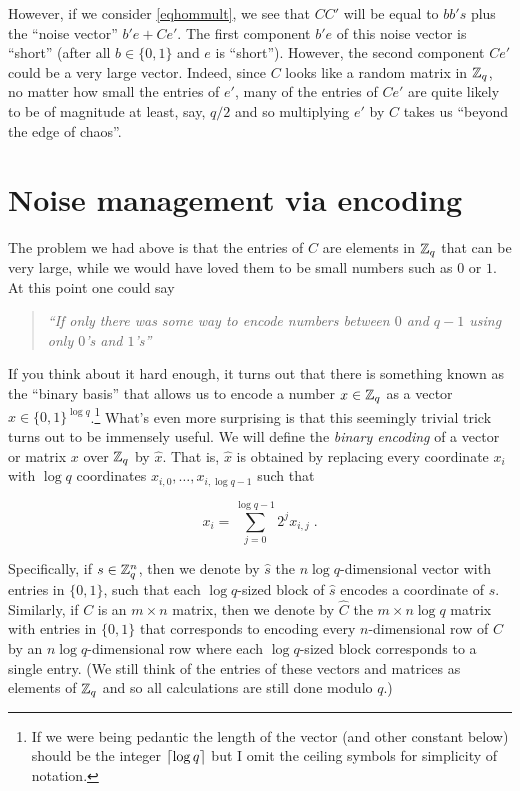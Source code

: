However, if we consider \eqref{eqhommult}, we see that
\(\ensuremath{\mathit{CC}}'\) will be equal to \(bb's\) plus the ``noise
vector'' \(b'e + Ce'\). The first component \(b'e\) of this noise vector
is ``short'' (after all \(b\in \{0,1\}\) and \(e\) is ``short'').
However, the second component \(Ce'\) could be a very large vector.
Indeed, since \(C\) looks like a random matrix in \({\mathbb{Z}}_q\), no matter
how small the entries of \(e'\), many of the entries of \(Ce'\) are
quite likely to be of magnitude at least, say, \(q/2\) and so
multiplying \(e'\) by \(C\) takes us ``beyond the edge of chaos''.

\section{Noise management via
encoding}\label{Noise-management-via-encoding}

The problem we had above is that the entries of \(C\) are elements in
\({\mathbb{Z}}_q\) that can be very large, while we would have loved them to be
small numbers such as \(0\) or \(1\). At this point one could say

\begin{quote}
\emph{``If only there was some way to encode numbers between \(0\) and
\(q-1\) using only \(0\)'s and \(1\)'s''}
\end{quote}

If you think about it hard enough, it turns out that there is something
known as the ``binary basis'' that allows us to encode a number
\(x\in{\mathbb{Z}}_q\) as a vector \(\hat{x}\in\{0,1\}^{\log q}\).\footnote{If we
  were being pedantic the length of the vector (and other constant
  below) should be the integer \(\lceil \log q \rceil\) but I omit the ceiling
  symbols for simplicity of notation.} What's even more surprising is
that this seemingly trivial trick turns out to be immensely useful. We
will define the \emph{binary encoding} of a vector or matrix \(x\) over
\({\mathbb{Z}}_q\) by \(\hat{x}\). That is, \(\hat{x}\) is obtained by replacing
every coordinate \(x_i\) with \(\log q\) coordinates
\(x_{i,0},\ldots,x_{i,\log q-1}\) such that

\[x_i = \sum_{j=0}^{\log q-1}2^j x_{i,j} \;. \label{eqbinaryencoding}\]

Specifically, if \(s\in {\mathbb{Z}}_q^n\), then we denote by \(\hat{s}\) the
\(n\log q\)-dimensional vector with entries in \(\{0,1\}\), such that
each \(\log q\)-sized block of \(\hat{s}\) encodes a coordinate of
\(s\). Similarly, if \(C\) is an \(m\times n\) matrix, then we denote by
\(\hat{C}\) the \(m\times n\log q\) matrix with entries in \(\{0,1\}\)
that corresponds to encoding every \(n\)-dimensional row of \(C\) by an
\(n\log q\)-dimensional row where each \(\log q\)-sized block
corresponds to a single entry. (We still think of the entries of these
vectors and matrices as elements of \({\mathbb{Z}}_q\) and so all calculations are
still done modulo \(q\).)

